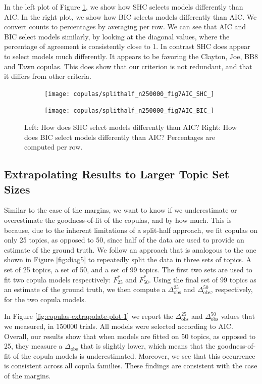 In the left plot of Figure \ref{fig:copulas-splithalf-plot-5}, we show how SHC selects models differently than AIC. In the right plot, we show how BIC selects models differently than AIC. We convert counts to percentages by averaging per row. We can see that AIC and BIC select models similarly, by looking at the diagonal values, where the percentage of agreement is consistently close to 1. In contrast SHC does appear to select models much differently. It appears to be favoring the Clayton, Joe, BB8 and Tawn copulas. This does show that our criterion is not redundant, and that it differs from other criteria.

\begin{figure}[!t]
	\centering	
	\begin{subfigure}[t]{.48\textwidth}
		\centering	
		\texttt{[image: copulas/splithalf\_n250000\_fig7AIC\_SHC\_]}
	\end{subfigure}%
	\begin{subfigure}[t]{.48\textwidth}
		\centering
		\texttt{[image: copulas/splithalf\_n250000\_fig7AIC\_BIC\_]}
	\end{subfigure}
	\caption{Left: How does SHC select models differently than AIC? Right:  How does BIC select models differently than AIC? Percentages are computed per row.}
	\label{fig:copulas-splithalf-plot-5}
\end{figure}


\subsection{Extrapolating Results to Larger Topic Set Sizes}

Similar to the case of the margins, we want to know if we underestimate or overestimate the goodness-of-fit of the copulas, and by how much. This is because, due to the inherent limitations of a split-half approach, we fit copulas on only 25 topics, as opposed to 50, since half of the data are used to provide an estimate of the ground truth. We follow an approach that is analogous to the one shown in Figure \ref{fig:diag5} to repeatedly split the data in three sets of topics. A set of 25 topics, a set of 50, and a set of 99 topics. The first two sets are used to fit two copula models respectively: $F_{25}^*$ and $F_{50}^*$. Using the final set of 99 topics as an estimate of the ground truth, we then compute a $\Delta_\text{obs}^{25}$ and $\Delta_\text{obs}^{50}$, respectively, for the two copula models.

In Figure \ref{fig:copulas-extrapolate-plot-1} we report the $\Delta_\text{obs}^{25}$ and $\Delta_\text{obs}^{50}$ values that we measured, in \num{150000} trials. All models were selected according to AIC. Overall, our results show that when models are fitted on 50 topics, as opposed to 25, they measure a $\Delta_\text{obs}$ that is slightly lower, which means that the goodness-of-fit of the copula models is underestimated. Moreover, we see that this occurrence is consistent across all copula families. These findings are consistent with the case of the margins. 

